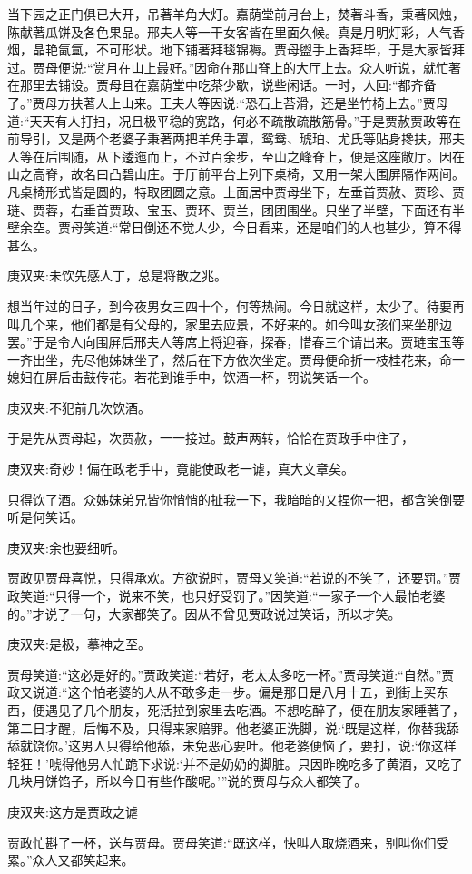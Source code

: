 \begin{parag}
    当下园之正门俱已大开，吊著羊角大灯。嘉荫堂前月台上，焚著斗香，秉著风烛，陈献著瓜饼及各色果品。邢夫人等一干女客皆在里面久候。真是月明灯彩，人气香烟，晶艳氤氲，不可形状。地下铺著拜毯锦褥。贾母盥手上香拜毕，于是大家皆拜过。贾母便说:“赏月在山上最好。”因命在那山脊上的大厅上去。众人听说，就忙著在那里去铺设。贾母且在嘉荫堂中吃茶少歇，说些闲话。一时，人回:“都齐备了。”贾母方扶著人上山来。王夫人等因说:“恐石上苔滑，还是坐竹椅上去。”贾母道:“天天有人打扫，况且极平稳的宽路，何必不疏散疏散筋骨。”于是贾赦贾政等在前导引，又是两个老婆子秉著两把羊角手罩，鸳鸯、琥珀、尤氏等贴身搀扶，邢夫人等在后围随，从下逶迤而上，不过百余步，至山之峰脊上，便是这座敞厅。因在山之高脊，故名曰凸碧山庄。于厅前平台上列下桌椅，又用一架大围屏隔作两间。凡桌椅形式皆是圆的，特取团圆之意。上面居中贾母坐下，左垂首贾赦、贾珍、贾琏、贾蓉，右垂首贾政、宝玉、贾环、贾兰，团团围坐。只坐了半壁，下面还有半壁余空。贾母笑道:“常日倒还不觉人少，今日看来，还是咱们的人也甚少，算不得甚么。\begin{note}庚双夹:未饮先感人丁，总是将散之兆。\end{note}想当年过的日子，到今夜男女三四十个，何等热闹。今日就这样，太少了。待要再叫几个来，他们都是有父母的，家里去应景，不好来的。如今叫女孩们来坐那边罢。”于是令人向围屏后邢夫人等席上将迎春，探春，惜春三个请出来。贾琏宝玉等一齐出坐，先尽他姊妹坐了，然后在下方依次坐定。贾母便命折一枝桂花来，命一媳妇在屏后击鼓传花。若花到谁手中，饮酒一杯，罚说笑话一个。\begin{note}庚双夹:不犯前几次饮酒。\end{note}于是先从贾母起，次贾赦，一一接过。鼓声两转，恰恰在贾政手中住了，\begin{note}庚双夹:奇妙！偏在政老手中，竟能使政老一谑，真大文章矣。\end{note}只得饮了酒。众姊妹弟兄皆你悄悄的扯我一下，我暗暗的又捏你一把，都含笑倒要听是何笑话。\begin{note}庚双夹:余也要细听。\end{note}贾政见贾母喜悦，只得承欢。方欲说时，贾母又笑道:“若说的不笑了，还要罚。”贾政笑道:“只得一个，说来不笑，也只好受罚了。”因笑道:“一家子一个人最怕老婆的。”才说了一句，大家都笑了。因从不曾见贾政说过笑话，所以才笑。\begin{note}庚双夹:是极，摹神之至。\end{note}贾母笑道:“这必是好的。”贾政笑道:“若好，老太太多吃一杯。”贾母笑道:“自然。”贾政又说道:“这个怕老婆的人从不敢多走一步。偏是那日是八月十五，到街上买东西，便遇见了几个朋友，死活拉到家里去吃酒。不想吃醉了，便在朋友家睡著了，第二日才醒，后悔不及，只得来家赔罪。他老婆正洗脚，说:‘既是这样，你替我舔舔就饶你。’这男人只得给他舔，未免恶心要吐。他老婆便恼了，要打，说:‘你这样轻狂！’唬得他男人忙跪下求说:‘并不是奶奶的脚脏。只因昨晚吃多了黄酒，又吃了几块月饼馅子，所以今日有些作酸呢。’”说的贾母与众人都笑了。\begin{note}庚双夹:这方是贾政之谑\end{note}贾政忙斟了一杯，送与贾母。贾母笑道:“既这样，快叫人取烧酒来，别叫你们受累。”众人又都笑起来。
\end{parag}


